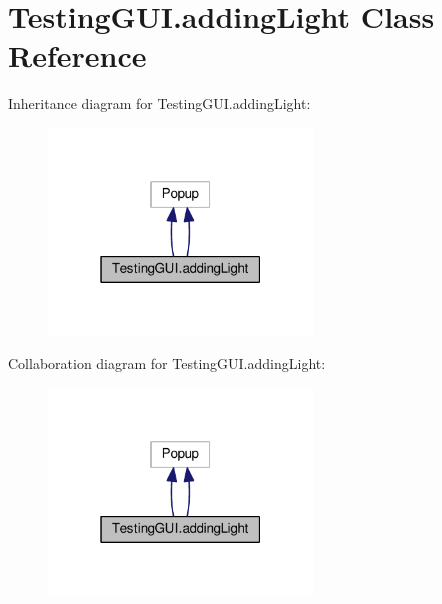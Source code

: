 \hypertarget{classTestingGUI_1_1addingLight}{}\section{Testing\+G\+U\+I.\+adding\+Light Class Reference}
\label{classTestingGUI_1_1addingLight}


Inheritance diagram for Testing\+G\+U\+I.\+adding\+Light\+:
\nopagebreak
\begin{figure}[H]
\begin{center}
\leavevmode
\includegraphics[width=199pt]{classTestingGUI_1_1addingLight__inherit__graph}
\end{center}
\end{figure}


Collaboration diagram for Testing\+G\+U\+I.\+adding\+Light\+:
\nopagebreak
\begin{figure}[H]
\begin{center}
\leavevmode
\includegraphics[width=199pt]{classTestingGUI_1_1addingLight__coll__graph}
\end{center}
\end{figure}
